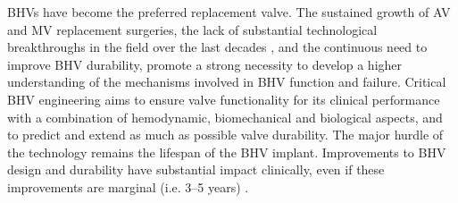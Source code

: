     
    BHVs have become the preferred replacement valve. The sustained growth of AV and MV replacement surgeries, the lack of substantial technological breakthroughs in the field over the last decades \cite{soares_biomechanical_2016}, and the continuous need to improve BHV durability, promote a strong necessity to develop a higher understanding of the mechanisms involved in BHV function and failure.  Critical BHV engineering aims to ensure valve functionality for its clinical performance with a combination of hemodynamic, biomechanical and biological aspects, and to predict and extend as much as possible valve durability. The major hurdle of the technology remains the lifespan of the BHV implant. Improvements to BHV design and durability have substantial impact clinically, even if these improvements are marginal (i.e. 3–5 years) \cite{jamieson_carpentier_1998}.
    